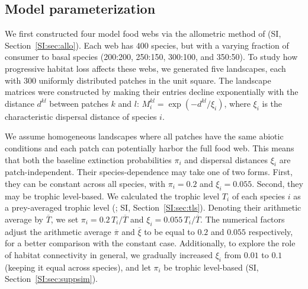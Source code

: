 \documentclass[11pt]{article}
\newcommand{\SI}{SI}
\begin{document}
\subsection{Model parameterization}

We first constructed four model food webs via the allometric method of \citet{Schneider2016} (\SI, Section~\ref{SI:sec:allo}). Each web has $400$ species, but with a varying fraction of consumer to basal species (200:200, 250:150, 300:100, and 350:50). To study how progressive habitat loss affects these webs, we generated five landscapes, each with $300$ uniformly distributed patches in the unit square. The landscape matrices were constructed by making their entries decline exponentially with the distance $d^{kl}$ between patches $k$ and $l$: $M_i^{kl} = \exp(-d^{kl} / \xi_i)$, where $\xi_i$ is the characteristic dispersal distance of species $i$.

We assume homogeneous landscapes where all patches have the same abiotic conditions and each patch can potentially harbor the full food web. This means that both the baseline extinction probabilities $\pi_i$ and dispersal distances $\xi_i$ are patch-independent. Their species-dependence may take one of two forms. First, they can be constant across all species, with $\pi_i = 0.2$ and $\xi_i = 0.055$. Second, they may be trophic level-based. We calculated the trophic level $T_i$ of each species $i$  as a prey-averaged trophic level (\citealp{WilliamsMartinez2004}; \SI, Section~\ref{SI:sec:tls}). Denoting their arithmetic average by $\overline{T}$, we set $\pi_i = 0.2 \, T_i / \overline{T}$ and $\xi_i = 0.055 \, T_i / \overline{T}$. The numerical factors adjust the arithmetic average $\overline{\pi}$ and $\overline{\xi}$ to be equal to $0.2$ and $0.055$ respectively, for a better comparison with the constant case. Additionally, to explore the role of habitat connectivity in general, we gradually increased $\xi_i$ from $0.01$ to $0.1$ (keeping it equal across species), and let $\pi_i$ be trophic level-based (\SI, Section~\ref{SI:sec:suppsim}).
\end{document}
